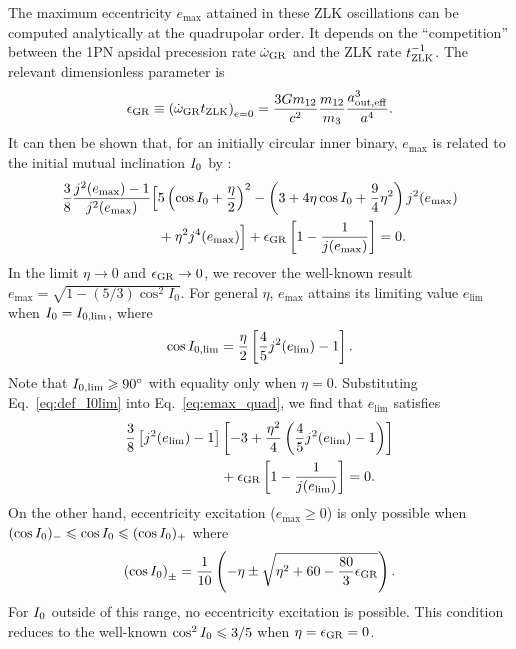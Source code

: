 \documentclass[
        fleqn,
        usenatbib,
    ]{mnras}
\newcommand*{\p}[1]{\left(#1\right)}
\newcommand*{\s}[1]{\left[#1\right]}
\begin{document}
The maximum eccentricity $e_{\max}$ attained in these ZLK oscillations can be
computed analytically at the quadrupolar order. It depends on the
``competition'' between the 1PN apsidal precession rate $\dot{\omega}_{\rm GR}$
and the ZLK rate $t_{\rm ZLK}^{-1}$. The relevant dimensionless parameter is
\begin{align}
    \epsilon_{\rm GR} \equiv \p{\dot{\omega}_{\rm GR} t_{\rm ZLK}}_{e = 0}
        = \frac{3Gm_{12}}{c^2} \frac{m_{12}}{m_3}\frac{a_{\rm out, eff}^3}{a^4}.
        \label{eq:def_epsgr}
\end{align}
It can then be shown that, for an initially circular inner binary, $e_{\max}$ is
related to the initial mutual inclination $I_{\rm 0}$ by \citep{LML15,
anderson2016formation}:
\begin{align}
    \frac{3}{8}\frac{j^2(e_{\max}) - 1}{j^2(e_{\max})}\Big[&
        5\p{\cos I_0 + \frac{\eta}{2}}^2
        - \p{3 + 4\eta \cos I_0 + \frac{9}{4}\eta^2}j^2(e_{\max})
            \nonumber\\
        &+ \eta^2 j^4(e_{\max})
    \Big] + \epsilon_{\rm GR}\s{1 - \frac{1}{j(e_{\max})}} = 0.
    \label{eq:emax_quad}
\end{align}
In the limit $\eta \to 0$ and $\epsilon_{\rm GR} \to 0$, we recover the
well-known result $e_{\max} = \sqrt{1 - (5/3) \cos^2 I_0}$. For general $\eta$,
$e_{\max}$ attains its limiting value $e_{\lim}$ when $I_{\rm 0} = I_{\rm 0,
\lim}$, where \textcolor{red}{\citep[see also][]{hamers_tp}}
\begin{align}
    \cos I_{\rm 0, \lim} = \frac{\eta}{2}\s{\frac{4}{5}j^2(e_{\lim}) -
        1}.\label{eq:def_I0lim}
\end{align}
Note that $I_{\rm 0, \lim} \geq 90^\circ$ with equality only when $\eta
= 0$. Substituting Eq.~\eqref{eq:def_I0lim} into Eq.~\eqref{eq:emax_quad}, we find
that $e_{\lim}$ satisfies
\begin{align}
    \frac{3}{8}\s{j^2(e_{\lim}) - 1}&\s{-3 + \frac{\eta^2}{4}
        \p{\frac{4}{5}j^2(e_{\lim}) - 1}}\nonumber\\
        &+ \epsilon_{\rm GR}\s{1 - \frac{1}{j(e_{\lim})}} = 0.
        \label{eq:def_elim}
\end{align}
On the other hand, eccentricity excitation ($e_{\max} \geq 0$) is only possible
when $(\cos I_{\rm 0})_- \leq \cos I_{\rm 0} \leq (\cos I_{\rm 0})_+$ where
\begin{align}
    \p{\cos I_{\rm 0}}_{\pm} = \frac{1}{10}\p{-\eta \pm \sqrt{\eta^2 + 60 -
        \frac{80}{3}\epsilon_{\rm GR}}}.\label{eq:I0bounds}
\end{align}
For $I_{\rm 0}$ outside of this range, no eccentricity excitation is possible.
This condition reduces to the well-known $\cos^2 I_{\rm 0} \leq 3/5$ when $\eta
= \epsilon_{\rm GR} = 0$.
\end{document}
